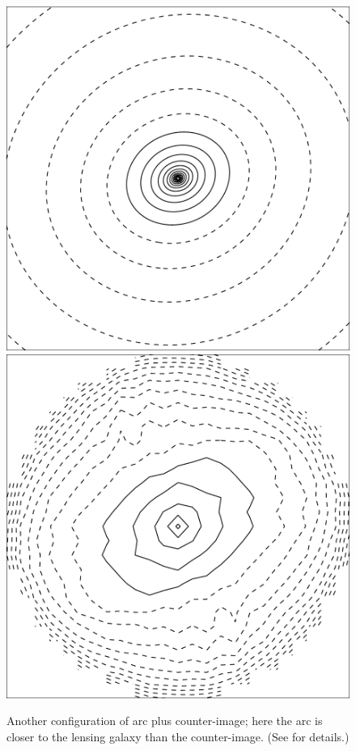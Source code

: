 \begin{figure}
  \includegraphics[width=\myplotswidth]{fig/ASW0002z6f_006919_kappa}
  \includegraphics[width=\myplotswidth]{fig/006919_mass}

  \caption[result 6919 (ASW0002z6f)]{Another configuration of arc plus
    counter-image; here the arc is closer to the lensing galaxy than
    the counter-image. (See  for details.)}
  \label{fig:6919}
\end{figure}



